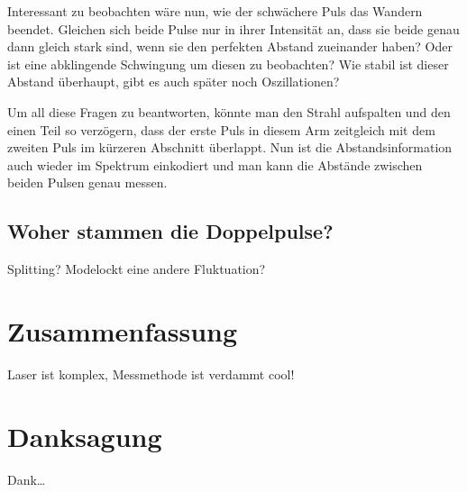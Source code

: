 \documentclass[bachelor,       %
               twoside,        %
               BCOR10mm,       %
               english,ngerman, %
               ]{GAUBM}
\begin{document}
Interessant zu beobachten wäre nun, wie der schwächere Puls das Wandern beendet.
Gleichen sich beide Pulse nur in ihrer Intensität an, dass sie beide genau dann gleich stark sind, wenn sie den perfekten Abstand zueinander haben?
Oder ist eine abklingende Schwingung um diesen zu beobachten?
Wie stabil ist dieser Abstand überhaupt, gibt es auch später noch Oszillationen?

Um all diese Fragen zu beantworten, könnte man den Strahl aufspalten und den einen Teil so verzögern, dass der erste Puls in diesem Arm zeitgleich mit dem zweiten Puls im kürzeren Abschnitt überlappt.
Nun ist die Abstandsinformation auch wieder im Spektrum einkodiert und man kann die Abstände zwischen beiden Pulsen genau messen.

\section{Woher stammen die Doppelpulse?}
Splitting?
Modelockt eine andere Fluktuation?


\chapter{Zusammenfassung}
Laser ist komplex, Messmethode ist verdammt cool!


\cleardoublepage
 

\chapter*{Danksagung}
Dank\dots

\Declaration
\end{document}
